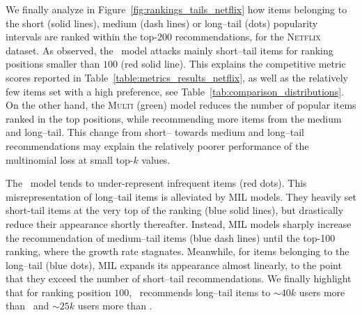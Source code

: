We finally analyze in Figure~\ref{fig:rankings_tails_netflix} how items belonging to the short (solid lines), medium (dash lines) or long--tail (dots) popularity intervals are ranked within the top-200 recommendations, for the \textsc{Netflix} dataset. 
As observed, the \CEpointlinsig\, model attacks mainly short--tail items for ranking positions smaller than $100$ (red solid line). This explains the competitive metric scores reported in Table~\ref{table:metrics_results_netflix}, as well as the relatively few items set with a high preference, see Table~\ref{tab:comparison_distributions}. 
On the other hand, the \textsc{Multi} (green) model reduces the number of popular items ranked in the top positions, while recommending more items from the medium and long--tail. This change from short-- towards medium and long--tail recommendations may explain the relatively poorer performance of the multinomial loss at small top-$k$ values.

The \CEpointlinsig\, model tends to under-represent infrequent items (red dots).
This misrepresentation of long--tail items is alleviated by \textsc{MIL} models.
They heavily set short-tail items at the very top of the ranking (blue solid lines), but drastically reduce their appearance shortly thereafter. Instead, \textsc{MIL} models sharply increase the recommendation of medium--tail items (blue dash lines)  until the top-100 ranking, where the growth rate stagnates. Meanwhile, for items belonging to the long--tail (blue dots), \textsc{MIL} expands its appearance almost linearly, to the point that they exceed the number of short--tail recommendations. 
We finally highlight  that for ranking position $100$, \MILlinsig\, recommends long--tail items to $\sim40k$ users more than \CEpointlinsig\, and $\sim25k$ users more than \MULTItanhlin. 


